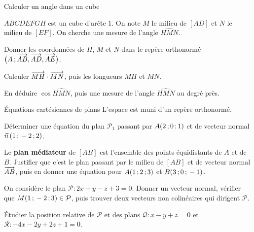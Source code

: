 \begin{exercice}[2]{Calculer un angle dans un cube}
\begin{codecote}[0.6]
$ABCDEFGH$ est un cube d'arête $1$. On note $M$ le milieu de $[AD]$ et $N$ le milieu de $[EF]$. On cherche une mesure de l'angle
$\widehat{HMN}$.
\begin{questions}
  \item Donner les coordonnées de $H$, $M$ et $N$ dans le repère orthonormé $\big(A\,{;}\,\overrightarrow{AB},\overrightarrow{AD},\overrightarrow{AE}\big)$.
  \item Calculer $\overrightarrow{MH}\cdot\overrightarrow{MN}$, puis les longueurs $MH$ et $MN$.
  \item En déduire $\cos\widehat{HMN}$, puis une mesure de l'angle $\widehat{HMN}$ au degré près.
\end{questions}
\cote
\centering
{}
\end{codecote}
\end{exercice}

\begin{exercice}[2]{Équations cartésiennes de plans}
L'espace est muni d'un repère orthonormé.
\begin{questions}
  \item Déterminer une équation du plan $\mathcal{P}_1$ passant par $A(2\,{;}\,0\,{;}\,1)$ et de vecteur normal $\vec n\,(1\,{;}\,-2\,{;}\,2)$.
  \item Le \textbf{plan médiateur} de $[AB]$ est l'ensemble des points équidistants de $A$ et de $B$. Justifier que c'est le plan passant
    par le milieu de $[AB]$ et de vecteur normal $\overrightarrow{AB}$, puis en donner une équation pour $A(1\,{;}\,2\,{;}\,3)$ et $B(3\,{;}\,0\,{;}\,-1)$.
  \item On considère le plan $\mathcal{P}:2x+y-z+3=0$. Donner un vecteur normal, vérifier que $M(1\,{;}\,-2\,{;}\,3)\in\mathcal{P}$, puis
    trouver deux vecteurs non colinéaires qui dirigent $\mathcal{P}$.
  \item Étudier la position relative de $\mathcal{P}$ et des plans $\mathcal{Q}:x-y+z=0$ et $\mathcal{R}:-4x-2y+2z+1=0$.
\end{questions}
\end{exercice}

